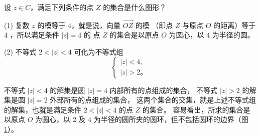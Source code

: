 \liti 设 $z \in C$，满足下列条件的点 $Z$ 的集合是什么图形？


\jie (1) 复数 $z$ 的模等于 $4$，就是说，向量 $\overrightarrow{OZ}$ 的模
（即点 $Z$ 与原点 $O$ 的距离）等于 $4$ ，所以满足条件 $|z| = 4$ 的
点 $Z$ 的集合是以原点 $O$ 为圆心，以 $4$ 为半径的圆。

(2) 不等式 $2 < |z| < 4$ 可化为不等式组
$$
\begin{cases}
    |z| < 4, \\
    |z| > 2 \text{。}
\end{cases}
$$

不等式 $|z| < 4$ 的解集是圆 $|z| = 4$ 内部所有的点组成的集合，
不等式 $|z| > 2$ 的解集是圆 $|z| = 2$ 外部所有的点组成的集合，
这两个集合的交集，就是上述不等式组的解集，也就是满足条件 $2 < |z| < 4$ 的点 $Z$ 的集合。
容易看出，所求的集合是以原点 $O$ 为圆心，以 $2$ 及 $4$ 为半径的圆所夹的圆环，但不包括圆环的边界（图 \ref{fig:5-4}）。

\begin{figure}[htbp]
    \centering
    
    \caption{}\label{fig:5-4}
\end{figure}


\lianxi
\begin{xiaotis}

\begin{xiaoxiaotis}




\end{xiaoxiaotis}




\end{xiaotis}